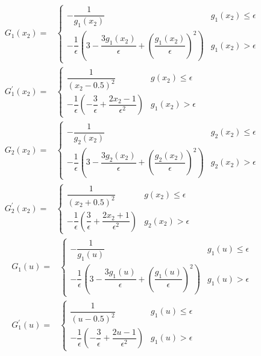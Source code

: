 \documentclass[12 pt]{article}
\begin{document}
\newpage
\begin{align*}
	G_1(x_2) = &
	\begin{cases}
		-\dfrac{1}{g_1(x_2)}&  g_1(x_2) \leq \epsilon \\[1em]
		-\dfrac{1}{\epsilon}\left(3 - \dfrac{3g_1(x_2)}{\epsilon} + \left(\dfrac{g_1(x_2)}{\epsilon}\right)^2\right) &  g_1(x_2) > \epsilon
	\end{cases} \\
	G_1^\prime(x_2) = &
\begin{cases}
	\dfrac{1}{(x_2 - 0.5)^2}&  g(x_2) \leq \epsilon \\[1em]
	-\dfrac{1}{\epsilon}\left(-\dfrac{3}{\epsilon} + \dfrac{2x_2-1}{\epsilon^2} \right) &  g_1(x_2) > \epsilon
\end{cases} 
\end{align*}
\begin{align*}
	G_2(x_2) = &
	\begin{cases}
		-\dfrac{1}{g_2(x_2)}&  g_2(x_2) \leq \epsilon \\[1em]
		-\dfrac{1}{\epsilon}\left(3 - \dfrac{3g_2(x_2)}{\epsilon} + \left(\dfrac{g_2(x_2)}{\epsilon}\right)^2\right) &  g_2(x_2) > \epsilon
	\end{cases} \\
	G_2^\prime(x_2) = &
	\begin{cases}
		\dfrac{1}{(x_2 + 0.5)^2}&  g(x_2) \leq \epsilon \\[1em]
		-\dfrac{1}{\epsilon}\left(\dfrac{3}{\epsilon} + \dfrac{2x_2+1}{\epsilon^2} \right) &  g_2(x_2) > \epsilon
	\end{cases} 
\end{align*}
\begin{align*}
	G_1(u) = &
	\begin{cases}
		-\dfrac{1}{g_1(u)}&  g_1(u) \leq \epsilon \\[1em]
		-\dfrac{1}{\epsilon}\left(3 - \dfrac{3g_1(u)}{\epsilon} + \left(\dfrac{g_1(u)}{\epsilon}\right)^2\right) &  g_1(u) > \epsilon
	\end{cases} \\
	G_1^\prime(u) = &
	\begin{cases}
		\dfrac{1}{(u - 0.5)^2}&  g_1(u) \leq \epsilon \\[1em]
		-\dfrac{1}{\epsilon}\left(-\dfrac{3}{\epsilon} + \dfrac{2u-1}{\epsilon^2} \right) &  g_1(u) > \epsilon
	\end{cases} 
\end{align*}
\end{document}
